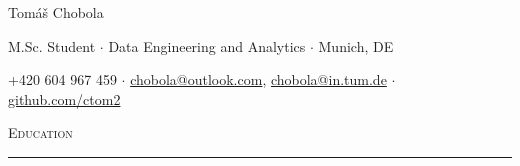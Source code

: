 \documentclass[10pt]{article}
\begin{document}
\begin{center}
    \begin{huge}
        Tomáš Chobola\\
    \end{huge}
\end{center}
\vspace{-1em}
\begin{center}
    \begin{small}
        M.Sc. Student $\cdot$ Data Engineering and Analytics $\cdot$ Munich, DE\\
    \end{small}
\end{center}
\vspace{-1em}
\begin{center}
    \begin{small}
        +420 604 967 459
        $\cdot$ 
        \href{mailto:chobola@outlook.com}{chobola@outlook.com}, \href{mailto:chobola@in.tum.de}{chobola@in.tum.de}
        $\cdot$
        \href{https://github.com/ctom2}{github.com/ctom2}\\
    \end{small}
\end{center}


\begin{Large}
    \textsc{Education}
    \vspace{0.4em}
    \hrule
    \vspace{0.4em}
\end{Large}
\end{document}
